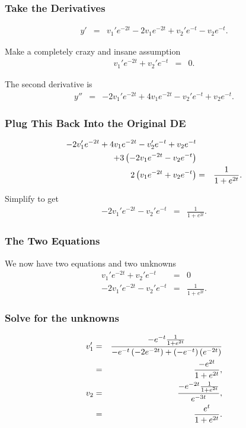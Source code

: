 \begin{frame}
  \frametitle{Take the Derivatives}
  \begin{eqnarray*}
    y' & = & v_1'e^{-2t} -2 v_1 e^{-2t} + v_2' e^{-t} - v_2 e^{-t}.
  \end{eqnarray*}

  Make a completely crazy and insane assumption
  \begin{eqnarray*}
    v_1'e^{-2t} + v_2' e^{-t}& = & 0.
  \end{eqnarray*}

  The second derivative is
  \begin{eqnarray*}
    y'' & = & -2 v_1' e^{-2t} + 4 v_1 e^{-2t} - v_2' e^{-t} + v_2 e^{-t}.
  \end{eqnarray*}
\end{frame}

\begin{frame}
  \frametitle{Plug This Back Into the Original DE}

  \begin{eqnarray*}
    -2 v_1' e^{-2t} + 4 v_1 e^{-2t} - v_2' e^{-t} + v_2 e^{-t} & & \\
    + 3 \left( -2 v_1 e^{-2t} - v_2 e^{-t} \right) & & \\
    2 \left( v_1 e^{-2t} + v_2 e^{-t} \right) & = & \frac{1}{1+e^{2t}}.
  \end{eqnarray*}

  Simplify to get
  \begin{eqnarray*}
    -2 v_1' e^{-2t}  - v_2' e^{-t} & = & \frac{1}{1+e^{2t}}.
  \end{eqnarray*}

\end{frame}

\begin{frame}
  \frametitle{The Two Equations}

  We now have two equations and two unknowns
  \begin{eqnarray*}
    v_1'e^{-2t} + v_2' e^{-t}& = & 0 \\
    -2 v_1' e^{-2t}  - v_2' e^{-t} & = & \frac{1}{1+e^{2t}}. 
  \end{eqnarray*}

\end{frame}

\begin{frame}
  \frametitle{Solve for the unknowns}
  \begin{eqnarray*}
    v_1' & = & \frac{-e^{-t} \frac{1}{1+e^{2t}}}{
      -e^{-t}\left( -2 e^{-2t} \right) + \left( - e^{-t}\right) \left( e^{-2t} \right)} \\
    & = & \frac{-e^{2t}}{1+e^{2t}}, \\
    v_2 & = & \frac{-e^{-2t}\frac{1}{1+e^{2t}}}{e^{-3t}}, \\
    & = & \frac{e^t}{1+e^{2t}}.
  \end{eqnarray*}
\end{frame}

